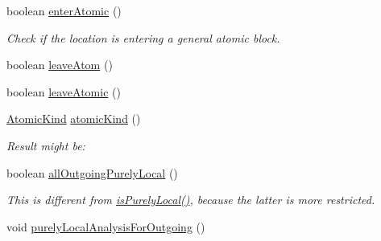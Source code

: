 \begin{DoxyCompactItemize}
boolean \hyperlink{interfaceedu_1_1udel_1_1cis_1_1vsl_1_1civl_1_1model_1_1IF_1_1location_1_1Location_a003d4ca21321e062d88dd69c0b87f79c}{enter\+Atomic} ()
\begin{DoxyCompactList}\small\item\em Check if the location is entering a general atomic block. \end{DoxyCompactList}\item 
boolean \hyperlink{interfaceedu_1_1udel_1_1cis_1_1vsl_1_1civl_1_1model_1_1IF_1_1location_1_1Location_a3e6ddb1ffd8366ab6ee514f19f478123}{leave\+Atom} ()
\item 
boolean \hyperlink{interfaceedu_1_1udel_1_1cis_1_1vsl_1_1civl_1_1model_1_1IF_1_1location_1_1Location_abc7e1d7f73fad973f3899d51a452c176}{leave\+Atomic} ()
\item 
\hyperlink{enumedu_1_1udel_1_1cis_1_1vsl_1_1civl_1_1model_1_1IF_1_1location_1_1Location_1_1AtomicKind}{Atomic\+Kind} \hyperlink{interfaceedu_1_1udel_1_1cis_1_1vsl_1_1civl_1_1model_1_1IF_1_1location_1_1Location_a52c91de6daa8098fd56f86d7a7c67972}{atomic\+Kind} ()
\begin{DoxyCompactList}\small\item\em Result might be\+: \end{DoxyCompactList}\item 
boolean \hyperlink{interfaceedu_1_1udel_1_1cis_1_1vsl_1_1civl_1_1model_1_1IF_1_1location_1_1Location_a17d6859790de2c1c288285c6b17b5e80}{all\+Outgoing\+Purely\+Local} ()
\begin{DoxyCompactList}\small\item\em This is different from \hyperlink{interfaceedu_1_1udel_1_1cis_1_1vsl_1_1civl_1_1model_1_1IF_1_1location_1_1Location_afc86b39bb8432f74ea31021b056123fe}{is\+Purely\+Local()}, because the latter is more restricted. \end{DoxyCompactList}\item 
\hypertarget{interfaceedu_1_1udel_1_1cis_1_1vsl_1_1civl_1_1model_1_1IF_1_1location_1_1Location_a1738bea1b83d10c25311b896ed1e3752}{}void \hyperlink{interfaceedu_1_1udel_1_1cis_1_1vsl_1_1civl_1_1model_1_1IF_1_1location_1_1Location_a1738bea1b83d10c25311b896ed1e3752}{purely\+Local\+Analysis\+For\+Outgoing} ()\label{interfaceedu_1_1udel_1_1cis_1_1vsl_1_1civl_1_1model_1_1IF_1_1location_1_1Location_a1738bea1b83d10c25311b896ed1e3752}


\end{DoxyCompactItemize}
